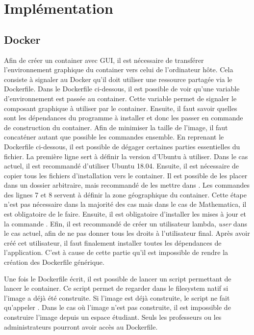 \section{Implémentation}

\subsection{Docker}

Afin de créer un container avec GUI, il est nécessaire de transférer l'environnement graphique du container vers celui de l'ordinateur hôte. 
Cela consiste à signaler au Docker qu'il doit utiliser une ressource partagée via le Dockerfile. 
Dans le Dockerfile ci-dessous, il est possible de voir qu'une variable d'environnement  est passée au container.
Cette variable permet de signaler le composant graphique à utiliser par le container.
\newline
Ensuite, il faut savoir quelles sont les dépendances du programme à installer et donc les passer en commande de construction du container.
Afin de minimiser la taille de l'image, il faut concaténer autant que possible les commandes ensemble. 
En reprenant le Dockerfile ci-dessous, il est possible de dégager certaines parties essentielles du fichier.
\newline
La première ligne sert à définir la version d'Ubuntu à utiliser.
Dans le cas actuel, il est recommandé d'utiliser Ubuntu 18.04.
Ensuite, il est nécessaire de copier tous les fichiers d'installation vers le container.
Il est possible de les placer dans un dossier arbitraire, mais recommandé de les mettre dans .
\newline
Les commandes des lignes 7 et 8 servent à définir la zone géographique du container.
Cette étape n'est pas nécessaire dans la majorité des cas mais dans le cas de Mathematica, il est obligatoire de le faire.
Ensuite, il est obligatoire d'installer les mises à jour et la commande  .
Efin, il est recommandé de créer un utilisateur lambda, \textit{user} dans le cas actuel, afin de ne pas donner tous les droits à l'utilisateur final.
Après avoir créé cet utilisateur, il faut finalement installer toutes les dépendances de l'application. 
C'est à cause de cette partie qu'il est impossible de rendre la création des Dockerfile générique.


Une fois le Dockerfile écrit, il est possible de lancer un script permettant de lancer le container.
Ce script permet de regarder dans le \gls{filesystem} natif si l'image a déjà été construite.
Si l'image est déjà construite, le script ne fait qu'appeler .
Dans le cas où l'image n'est pas construite, il est impossible de construire l'image depuis un espace étudiant.
Seuls les professeurs ou les administrateurs pourront avoir accès au Dockerfile.

